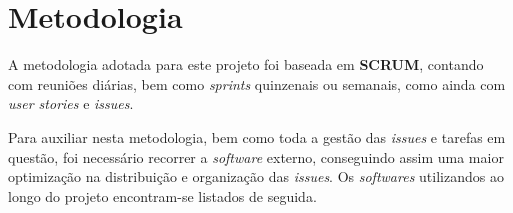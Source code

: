 
\section{Metodologia}

A metodologia adotada para este projeto foi baseada em \textbf{SCRUM}, contando com reuniões diárias, bem como \textit{sprints} quinzenais ou semanais, como ainda com \textit{user stories} e \textit{issues}.

Para auxiliar nesta metodologia, bem como toda a gestão das \textit{issues} e tarefas em questão, foi necessário recorrer a \textit{software} externo, conseguindo assim uma maior optimização na distribuição e organização das \textit{issues}. Os \textit{softwares} utilizandos ao longo do projeto encontram-se listados de seguida.






